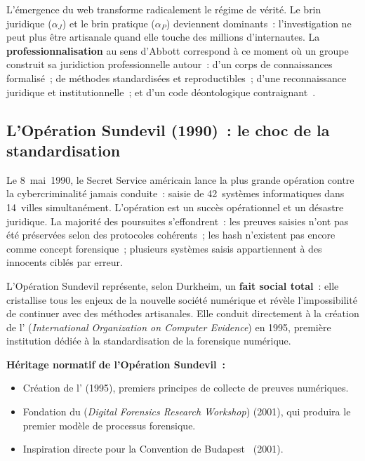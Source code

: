 L'émergence du web transforme radicalement le régime de vérité. Le brin
juridique ($\alpha_J$) et le brin pratique ($\alpha_P$) deviennent dominants~:
l'investigation ne peut plus être artisanale quand elle touche des millions
d'internautes. La \textbf{professionnalisation} au sens d'Abbott correspond
à ce moment où un groupe construit sa juridiction professionnelle autour~:
d'un corps de connaissances formalisé~; de méthodes standardisées et
reproductibles~; d'une reconnaissance juridique et institutionnelle~; et
d'un code déontologique contraignant~\cite{abbott1988}.

\subsection{L'Opération Sundevil (1990)~: le choc de la standardisation}

Le 8~mai~1990, le Secret Service américain lance la plus grande opération
contre la cybercriminalité jamais conduite~: saisie de 42~systèmes
informatiques dans 14~villes simultanément. L'opération est un succès
opérationnel et un désastre juridique. La majorité des poursuites
s'effondrent~: les preuves saisies n'ont pas été préservées selon des
protocoles cohérents~; les hash n'existent pas encore comme concept
forensique~; plusieurs systèmes saisis appartiennent à des innocents ciblés
par erreur.

\medskip

L'Opération Sundevil représente, selon Durkheim, un \textbf{fait social total}~:
elle cristallise tous les enjeux de la nouvelle société numérique et révèle
l'impossibilité de continuer avec des méthodes artisanales. Elle conduit
directement à la création de l' (\textit{International Organization
on Computer Evidence}) en 1995, première institution dédiée à la
standardisation de la forensique numérique.

\begin{boxjuris}
\textbf{Héritage normatif de l'Opération Sundevil~:}
\begin{itemize}
    \item Création de l' (1995), premiers principes de collecte
          de preuves numériques.
    \item Fondation du  (\textit{Digital Forensics Research
          Workshop}) (2001), qui produira le premier modèle de processus
          forensique.
    \item Inspiration directe pour la Convention de Budapest~\cite{budapest2001} (2001).
\end{itemize}
\end{boxjuris}

